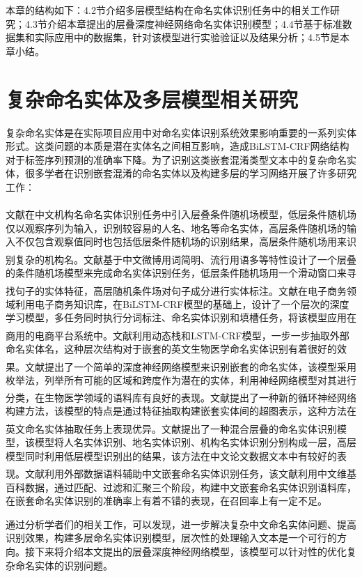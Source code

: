 \documentclass[winfonts,master,oneside,nobackinfo]{njuthesis}
\newcommand{\upcite}[1]{\textsuperscript{\textsuperscript{\cite{#1}}}}
\begin{document}
本章的结构如下：4.2节介绍多层模型结构在命名实体识别任务中的相关工作研究；4.3节介绍本章提出的层叠深度神经网络命名实体识别模型；4.4节基于标准数据集和实际应用中的数据集，针对该模型进行实验验证以及结果分析；4.5节是本章小结。





\section{复杂命名实体及多层模型相关研究}

复杂命名实体是在实际项目应用中对命名实体识别系统效果影响重要的一系列实体形式。这类问题的本质是潜在实体名之间相互影响，造成BiLSTM-CRF网络结构对于标签序列预测的准确率下降。为了识别这类嵌套混淆类型文本中的复杂命名实体，很多学者在识别嵌套混淆的命名实体以及构建多层的学习网络开展了许多研究工作：

文献\upcite{junsheng}在中文机构名命名实体识别任务中引入层叠条件随机场模型，低层条件随机场仅以观察序列为输入，识别较容易的人名、地名等命名实体，高层条件随机场的输入不仅包含观察值同时也包括低层条件随机场的识别结果，高层条件随机场用来识别复杂的机构名。文献\upcite{Yixue}基于中文微博用词简明、流行用语多等特性设计了一个层叠的条件随机场模型来完成命名实体识别任务，低层条件随机场用一个滑动窗口来寻找句子的实体特征，高层随机条件场对句子成分进行实体标注。文献\upcite{taobao}在电子商务领域利用电子商务知识库，在BiLSTM-CRF模型的基础上，设计了一个层次的深度学习模型，多任务同时执行分词标注、命名实体识别和填槽任务，将该模型应用在商用的电商平台系统中。文献\upcite{Meizhi}利用动态栈和LSTM-CRF模型，一步一步抽取外部命名实体名，这种层次结构对于嵌套的英文生物医学命名实体识别有着很好的效果。文献\upcite{Mohammad}提出了一个简单的深度神经网络模型来识别嵌套的命名实体，该模型采用枚举法，列举所有可能的区域和跨度作为潜在的实体，利用神经网络模型对其进行分类，在生物医学领域的语料库有良好的表现。文献\upcite{Arzoo}提出了一种新的循环神经网络构建方法，该模型的特点是通过特征抽取构建嵌套实体间的超图表示，这种方法在英文命名实体抽取任务上表现优异。文献\upcite{Jia}提出了一种混合层叠的命名实体识别模型，该模型将人名实体识别、地名实体识别、机构名实体识别分别构成一层，高层模型同时利用低层模型识别出的结果，该方法在中文论文数据文本中有较好的表现。文献\upcite{yanqun}利用外部数据语料辅助中文嵌套命名实体识别任务，该文献利用中文维基百科数据，通过匹配、过滤和汇聚三个阶段，构建中文嵌套命名实体识别语料库，在嵌套命名实体识别的准确率上有着不错的表现，在召回率上有一定不足。

通过分析学者们的相关工作，可以发现，进一步解决复杂中文命名实体问题、提高识别效果，构建多层命名实体识别模型，层次性的处理输入文本是一个可行的方向。接下来将介绍本文提出的层叠深度神经网络模型，该模型可以针对性的优化复杂命名实体的识别问题。
\end{document}
